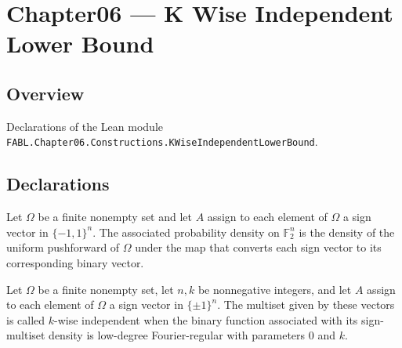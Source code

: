 \chapter{Chapter06 — K Wise Independent Lower Bound}
\section{Overview}

Declarations of the Lean module \texttt{FABL.Chapter06.Constructions.KWiseIndependentLowerBound}.

\section{Declarations}

\begin{definition}
\label{FABL.signMultisetDensity}
\leanok
{}
Let $\Omega$ be a finite nonempty set and let $A$ assign to each element of $\Omega$ a
sign vector in $\{-1,1\}^n$. The associated probability density on $\mathbb{F}_2^n$ is
the density of the uniform pushforward of $\Omega$ under the map that converts each sign
vector to its corresponding binary vector.
\end{definition}

\begin{definition}
\label{FABL.IsKWiseIndependentMultiset}
\leanok
{}
Let $\Omega$ be a finite nonempty set, let $n,k$ be nonnegative integers, and let $A$
assign to each element of $\Omega$ a sign vector in $\{\pm1\}^n$. The multiset given by
these vectors is called $k$-wise independent when the binary function associated with
its sign-multiset density is low-degree Fourier-regular with parameters $0$ and $k$.
\end{definition}

